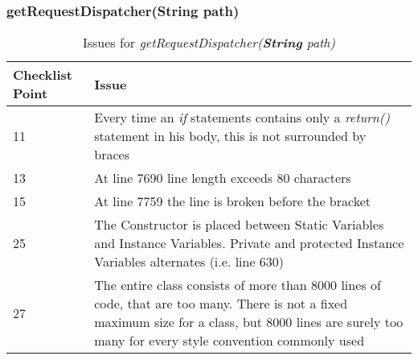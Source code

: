 \subsubsection{getRequestDispatcher(String path)}
\begin{table}[htbp]
\begin{center}
\begin{tabular}[t]{p{}p{}}

\hline
\textbf{Checklist Point} & \textbf{Issue} \\
\hline
11 & Every time an \textit{if} statements contains only a \textit{return()} statement in his body, this is not surrounded by braces \\
\hline
13 & At line 7690 line length exceeds 80 characters \\
\hline
15 & At line 7759 the line is broken before the bracket \\
\hline
25 & The Constructor is placed between Static Variables and  Instance Variables. Private and protected Instance Variables alternates (i.e. line 630) \\
\hline
27 & The entire class consists of more than 8000 lines of code, that are too many. There is not a fixed maximum size for a class, but 8000 lines are surely too many for every style convention commonly used \\
\hline

\end{tabular}
\end{center}
\caption{Issues for \textit{getRequestDispatcher(\textbf{String} path)}}
\end{table}
\clearpage